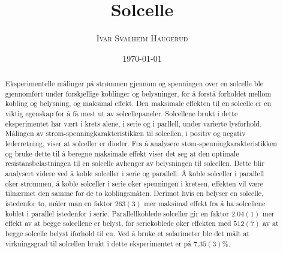 \documentclass[%
 reprint,
 amsmath,amssymb,
 aps,
 norsk,
 booktabs
]{revtex4-1}
\begin{document}
\title{Solcelle}
\author{\textsc{Ivar Svalheim Haugerud}}
\date{\today}

\begin{abstract}
Eksperimentelle målinger på strømmen gjennom og spenningen over en solcelle ble gjennomført under forskjellige koblinger og belysninger, for å forstå forholdet mellom kobling og belysning, og maksimal effekt. Den maksimale effekten til en solcelle er en viktig egenskap for å få mest ut av solcellepaneler. Solcellene brukt i dette eksperimentet har vært i krets alene, i serie og i parllell, under varierte lysforhold. Målingen av strøm-spenningkarakteristikken til solcellen, i positiv og negativ lederretning, viser at solceller er dioder. Fra å analysere støm-spenningkarakteristikken og bruke dette til å beregne maksimale effekt viser det seg at den optimale resistansbelastningen til en solcelle avhenger av belysningen til solcellen. Dette blir analysert videre ved å koble solceller i serie og parallell. Å koble solceller i parallell øker strømmen, å koble solceller i serie øker spenningen i kretsen, effekten vil være tilnærmet den samme for de to koblingsmåten. Derimot hvis en belyser en solcelle, istedenfor to, måler man en faktor $263(3)$ mer maksimal effekt fra å ha solcellene koblet i parallel istedenfor i serie. Parallellkoblede solceller gir en faktor $2.04(1)$ mer effekt av at begge solcellene er belyst, for seriekoblede øker effekten med $512(7)$ av at begge solcelle belyst iforhold til en. Ved å bruke et solarimeter ble det målt at virkningsgrad til solcellen brukt i dette eksperimentet er på $7.35(3)\%$.
\end{abstract}

\maketitle

\end{document}
